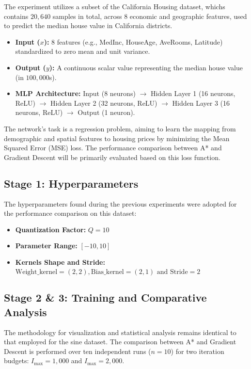 The experiment utilizes a subset of the California Housing dataset, whichs contains $20,640$ samples in total, across $8$ economic and geographic features, used to predict the median house value in California districts.

\begin{itemize}
    \item \textbf{Input ($x$):} 8 features (e.g., MedInc, HouseAge, AveRooms, Latitude) standardized to zero mean and unit variance.
    \item \textbf{Output ($y$):} A continuous scalar value representing the median house value (in $100,000$s).
    \item \textbf{MLP Architecture:} Input (8 neurons) $\rightarrow$ 
      Hidden Layer 1 (16 neurons, ReLU) $\rightarrow$ 
      Hidden Layer 2 (32 neurons, ReLU) $\rightarrow$ 
      Hidden Layer 3 (16 neurons, ReLU) $\rightarrow$ 
      Output (1 neuron).
\end{itemize}

\noindent The network's task is a regression problem, aiming to learn the mapping from demographic and spatial features to housing prices by minimizing the Mean Squared Error (MSE) loss. The performance comparison between A* and Gradient Descent will be primarily evaluated based on this loss function.

\subsection{Stage 1: Hyperparameters}

\noindent The hyperparameters found during the previous experiments were adopted for the performance comparison on this dataset:
\begin{itemize}
    \item \textbf{Quantization Factor:} $Q=10$
    \item \textbf{Parameter Range:} $[-10, 10]$
    \item \textbf{Kernels Shape and Stride:} $\text{Weight\_kernel}=(2,2), \text{Bias\_kernel}=(2,1) \text{ and Stride}=2$
\end{itemize}

\subsection{Stage 2 \& 3: Training and Comparative Analysis}

\noindent The methodology for visualization and statistical analysis remains identical to that employed for the sine dataset. The comparison between A* and Gradient Descent is performed over ten independent runs ($n=10$) for two iteration budgets: $I_{\text{max}}=1,000$ and $I_{\text{max}}=2,000$.

